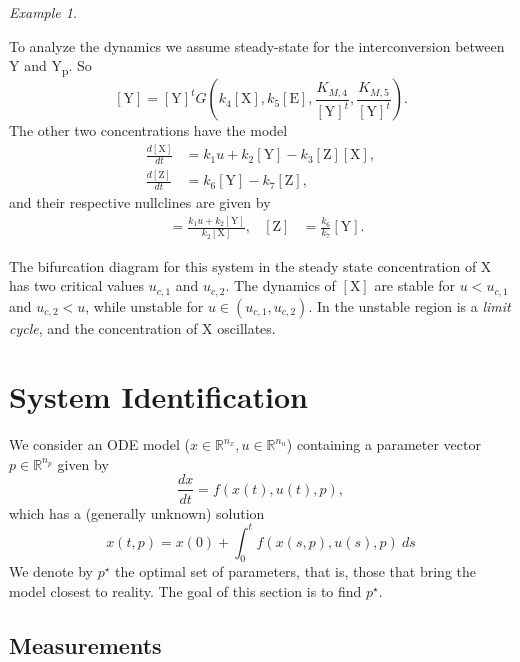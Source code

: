 \documentclass[a4paper]{article}
\newcommand{\co}[1]{[\text{#1}]} %
\theoremstyle{plain}
\theoremstyle{definition}
\theoremstyle{remark}
\newtheorem*{example}{Example}
\begin{document}
\begin{example}
\begin{center}
\begin{tikzpicture}
    \end{tikzpicture}
  \end{center}
  To analyze the dynamics we assume steady-state for the interconversion
  between Y and Y\textsubscript{p}. So
  \[
    \co{Y} = \co{Y}^t G\left(
      k_4 \co{X}, k_5 \co{E}, \frac{K_{M,4}}{\co{Y}^t}, \frac{K_{M,5}}{\co{Y}^t}
    \right).
  \]
  The other two concentrations have the model
  \begin{align*}
    \frac{d\co{X}}{dt} &= k_1 u + k_2 \co{Y} - k_3 \co{Z} \co{X}, \\
    \frac{d\co{Z}}{dt} &= k_6 \co{Y} - k_7 \co{Z},
  \end{align*}
  and their respective nullclines are given by
  \begin{align*}
    \co{Z} &= \frac{k_1 u + k_2 \co{Y}}{k_2 \co{X}}, &
    \co{Z} &= \frac{k_6}{k_7} \co{Y}.
  \end{align*}

  The bifurcation diagram for this system in the steady state concentration of
  X has two critical values $u_{c,1}$ and $u_{c,2}$. The dynamics of $\co{X}$
  are stable for $u < u_{c,1}$ and $u_{c,2} < u$, while unstable for $u \in
  (u_{c,1}, u_{c,2})$. In the unstable region is a \emph{limit cycle}, and the
  concentration of X oscillates.
\end{example}



\section{System Identification}

We consider an ODE model ($x \in \mathbb{R}^{n_x}, u \in \mathbb{R}^{n_u}$)
containing a parameter vector $p \in \mathbb{R}^{n_p}$ given by
\begin{equation} \label{eqn:dynamics-p}
  \frac{dx}{dt} = f(x(t), u(t), p),
\end{equation}
which has a (generally unknown) solution
\begin{equation} \label{eqn:sol-p}
  x(t, p) = x(0) + \int_0^t f(x(s, p), u(s), p) ~ ds
\end{equation}
We denote by $p^\star$ the optimal set of parameters, that is, those that
bring the model closest to reality. The goal of this section is to find
$p^\star$.

\subsection{Measurements}
\end{document}
